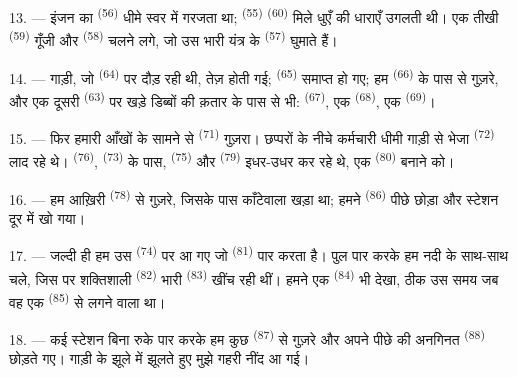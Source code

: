 13. --- इंजन का  \textsuperscript{(56)} धीमे स्वर में गरजता था;
 \textsuperscript{(55)}  \textsuperscript{(60)} मिले धुएँ
की धाराएँ उगलती थी। एक तीखी  \textsuperscript{(59)} गूँजी और
 \textsuperscript{(58)} चलने लगे, जो उस भारी यंत्र के
 \textsuperscript{(57)} घुमाते हैं।

\VUsaut{3.0mm}
\VUsaut{3.0mm}

14. --- गाड़ी, जो  \textsuperscript{(64)} पर दौड़ रही थी, तेज़
होती गई;  \textsuperscript{(65)} समाप्त हो गए; हम
 \textsuperscript{(66)} के पास से गुज़रे, और एक दूसरी
 \textsuperscript{(63)} पर खड़े डिब्बों की क़तार के पास से भी:
 \textsuperscript{(67)}, एक 
\textsuperscript{(68)}, एक  \textsuperscript{(69)}।


15. --- फिर हमारी आँखों के सामने से  \textsuperscript{(71)}
गुज़रा। छप्परों के नीचे कर्मचारी धीमी गाड़ी से भेजा 
\textsuperscript{(72)} लाद रहे थे।  \textsuperscript{(76)},
 \textsuperscript{(73)} के पास, 
\textsuperscript{(75)} और  \textsuperscript{(79)} इधर-उधर कर
रहे थे, एक  \textsuperscript{(80)} बनाने को।

16. --- हम आख़िरी  \textsuperscript{(78)} से गुज़रे, जिसके पास
काँटेवाला खड़ा था; हमने  \textsuperscript{(86)} पीछे छोड़ा और
स्टेशन दूर में खो गया।

17. --- जल्दी ही हम उस  \textsuperscript{(74)} पर आ गए जो
 \textsuperscript{(81)} पार करता है। पुल पार करके हम नदी के साथ-साथ
चले, जिस पर शक्तिशाली  \textsuperscript{(82)} भारी
 \textsuperscript{(83)} खींच रही थीं। हमने एक
 \textsuperscript{(84)} भी देखा, ठीक उस समय जब वह एक
 \textsuperscript{(85)} से लगने वाला था।

18. --- कई स्टेशन बिना रुके पार करके हम कुछ  \textsuperscript{(87)}
से गुज़रे और अपने पीछे  की अनगिनत 
\textsuperscript{(88)} छोड़ते गए। गाड़ी के झूले में झूलते हुए मुझे गहरी नींद आ गई।

